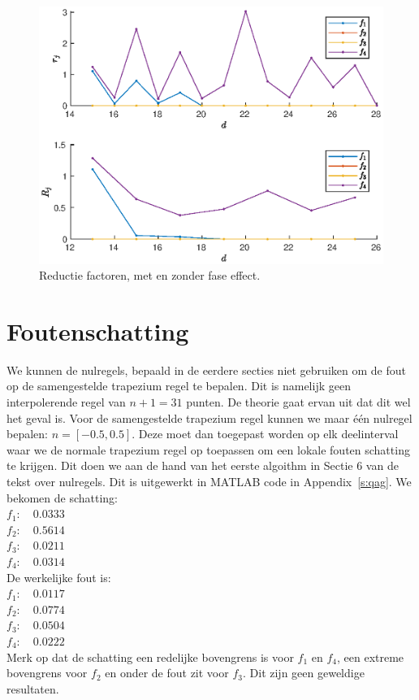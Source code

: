 \documentclass{article}
\begin{document}
\begin{figure}[H]
\centering
\includegraphics[width=0.95\linewidth]{R.eps}
\caption{Reductie factoren, met en zonder fase effect.} \label{fig:R}
\end{figure}

\section{Foutenschatting}
We kunnen de nulregels, bepaald in de eerdere secties niet gebruiken om de fout op de samengestelde trapezium regel te bepalen. Dit is namelijk geen interpolerende regel van $n+1=31$ punten. De theorie gaat ervan uit dat dit wel het geval is. Voor de samengestelde trapezium regel kunnen we maar één nulregel bepalen: $n = \left[-0.5, 0.5\right]$. Deze moet dan toegepast worden op elk deelinterval waar we de normale trapezium regel op toepassen om een lokale fouten schatting te krijgen. Dit doen we aan de hand van het eerste algoithm in Sectie 6 van de tekst over nulregels. Dit is uitgewerkt in MATLAB code in Appendix~\ref{s:qag}. We bekomen de schatting: \\
$f_1: \quad 0.0333$ \\
$f_2: \quad 0.5614$ \\
$f_3: \quad 0.0211$ \\
$f_4: \quad 0.0314$ \\
De werkelijke fout is: \\
$f_1: \quad 0.0117$ \\
$f_2: \quad 0.0774$ \\
$f_3: \quad 0.0504$ \\
$f_4: \quad 0.0222$ \\
Merk op dat de schatting een redelijke bovengrens is voor $f_1$ en $f_4$, een extreme bovengrens voor $f_2$ en onder de fout zit voor $f_3$.
Dit zijn geen geweldige resultaten.
\end{document}
